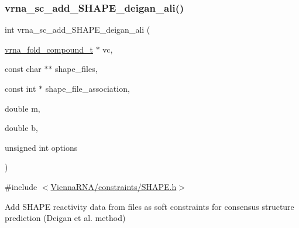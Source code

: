 \subsubsection{\texorpdfstring{vrna\+\_\+sc\+\_\+add\+\_\+\+S\+H\+A\+P\+E\+\_\+deigan\+\_\+ali()}{vrna\_sc\_add\_SHAPE\_deigan\_ali()}}
{\footnotesize\ttfamily int vrna\+\_\+sc\+\_\+add\+\_\+\+S\+H\+A\+P\+E\+\_\+deigan\+\_\+ali (\begin{DoxyParamCaption}\item[{\hyperlink{group__fold__compound_ga1b0cef17fd40466cef5968eaeeff6166}{vrna\+\_\+fold\+\_\+compound\+\_\+t} $\ast$}]{vc,  }\item[{const char $\ast$$\ast$}]{shape\+\_\+files,  }\item[{const int $\ast$}]{shape\+\_\+file\+\_\+association,  }\item[{double}]{m,  }\item[{double}]{b,  }\item[{unsigned int}]{options }\end{DoxyParamCaption})}



{\ttfamily \#include $<$\hyperlink{SHAPE_8h}{Vienna\+R\+N\+A/constraints/\+S\+H\+A\+P\+E.\+h}$>$}



Add S\+H\+A\+PE reactivity data from files as soft constraints for consensus structure prediction (Deigan et al. method) 


